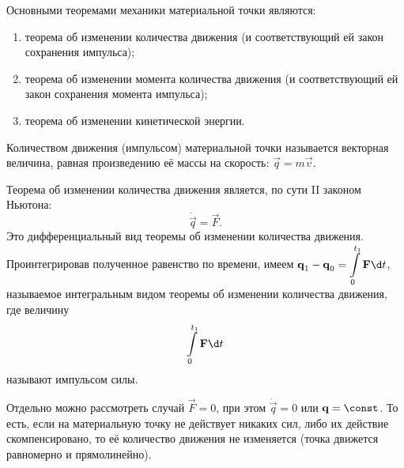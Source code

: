 
Основными теоремами механики материальной точки являются:
\begin{enumerate}
    \item теорема об изменении количества движения (и соответствующий ей закон
    сохранения импульса);
    \item теорема об изменении момента количества движения (и соответствующий ей
    закон сохранения момента импульса);
    \item теорема об изменении кинетической энергии.
\end{enumerate}


Количеством движения (импульсом) материальной точки
называется векторная величина, равная произведению её массы на скорость:
\( \vec{q} = m\vec{v} \).

Теорема об изменении количества движения является, по сути II законом Ньютона:
\[
    \dot{\vec{q}} = \vec{F}.
\]
Это дифференциальный вид теоремы об изменении количества движения.
Проинтегрировав полученное равенство по времени, имеем \( \ds \vec{q}_1 -
\vec{q}_0 = \int\limits_0^{t_1} \vec{F}\d t \), называемое интегральным видом
теоремы об изменении количества движения, где величину
\[
    \int\limits_0^{t_1} \vec{F}\d t
\]
называют импульсом силы.


Отдельно можно рассмотреть случай \( \vec{F} = 0 \), при этом \( \dot{\vec{q}} =
0 \) или \( \vec{q} = \const \). То есть, если на материальную точку не
действует никаких сил, либо их действие скомпенсировано, то её количество
движения не изменяется (точка движется равномерно и прямолинейно).

\newpage %